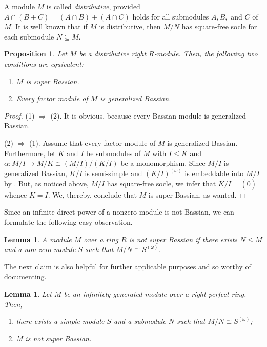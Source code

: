 \documentclass{amsart}
\newtheorem{lm}[thm]{Lemma}
\newtheorem{prop}[thm]{Proposition}
\theoremstyle{definition}
\begin{document}
A module \( M \) is called \emph{distributive}, provided $A \cap (B + C) = (A \cap B) + (A \cap C)$ holds for all submodules \( A, B, \) and \( C \) of \( M \). It is well known that if $M$ is distributive, then \( M/N \) has square-free socle for each submodule \( N \subseteq M \).

\begin{prop}
Let $M$ be a distributive right $R$-module. Then, the following two conditions are equivalent:
\begin{enumerate}
\item $M$ is super Bassian.
\item Every factor module of $M$ is generalized Bassian.
\end{enumerate}
\end{prop}

\begin{proof}
(1) $\Rightarrow$ (2). It is obvious, because every Bassian module is generalized Bassian.	
	
(2) $\Rightarrow$ (1). Assume that every factor module of $M$ is generalized Bassian. Furthermore, let $K$ and $I$ be submodules of $M$ with $I\leq K$ and $\alpha: M/I\to M/K\cong (M/I)/(K/I)$ be a monomorphism. Since $M/I$ is generalized Bassian, $K/I$ is semi-simple and $(K/I)^{(\omega)}$ is embeddable into $M/I$ by
\cite[Proposition 4.4]{DKTZ}. But, as noticed above, $M/I$ has square-free socle, we infer that $K/I=(\bar{0})$ whence $K=I$. We, thereby, conclude that $M$ is super Bassian, as wanted.
\end{proof}

Since an infinite direct power of a nonzero module is not Bassian, we can formulate the following easy observation.

\begin{lm}\label{super} A module $M$ over a ring $R$ is not super Bassian if there exists $N\le M$ and a non-zero module $S$ such that $M/N\cong S^{(\omega)}$.
\end{lm}

The next claim is also helpful for further applicable purposes and so worthy of documenting.

\begin{lm}\label{perfect} Let $M$ be an infinitely generated module over a right perfect ring. Then,
\begin{enumerate}
\item there exists a simple module $S$ and a submodule $N$ such that $M/N\cong S^{(\omega)}$;
\item M is not super Bassian.
\end{enumerate}
\end{lm}
\end{document}
